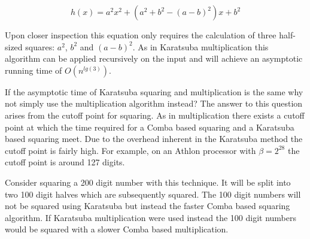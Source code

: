 \documentclass[b5paper]{book}
\begin{document}
\begin{equation}
h(x) = a^2x^2 + \left (a^2 + b^2 - (a - b)^2 \right )x + b^2
\end{equation}

Upon closer inspection this equation only requires the calculation of three half-sized squares: $a^2$, $b^2$ and $(a - b)^2$.  As in 
Karatsuba multiplication this algorithm can be applied recursively on the input and will achieve an asymptotic running time of 
$O \left ( n^{lg(3)} \right )$.

If the asymptotic time of Karatsuba squaring and multiplication is the same why not simply use the multiplication algorithm instead?  The answer
to this question arises from the cutoff point for squaring.  As in multiplication there exists a cutoff point at which the time required for a 
Comba based squaring and a Karatsuba based squaring meet.  Due to the overhead inherent in the Karatsuba method the cutoff point is fairly 
high.  For example, on an Athlon processor with $\beta = 2^{28}$ the cutoff point is around 127 digits.  

Consider squaring a 200 digit number with this technique.  It will be split into two 100 digit halves which are subsequently squared.  
The 100 digit numbers will not be squared using Karatsuba but instead the faster Comba based squaring algorithm.  If Karatsuba multiplication
were used instead the 100 digit numbers would be squared with a slower Comba based multiplication.  
\end{document}
